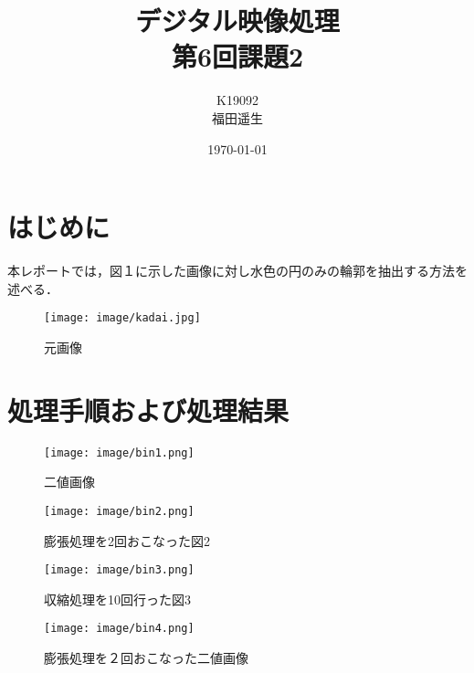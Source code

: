 \documentclass[a4paper,11pt]{jsarticle}
\begin{document}
\title{デジタル映像処理\\第6回課題2}
\author{K19092\\福田遥生}
\date{\today}
\maketitle

\section{はじめに}


本レポートでは，図１に示した画像に対し水色の円のみの輪郭を抽出する方法を述べる．

\begin{figure}[h]
  \centering
  \texttt{[image: image/kadai.jpg]}
  \caption{元画像}
\end{figure}

\section{処理手順および処理結果}
\begin{figure}[h]
  \begin{minipage}{0.5\hsize}
    \begin{center}
      \texttt{[image: image/bin1.png]}
      \caption{二値画像}
    \end{center}
  \end{minipage}
  \begin{minipage}{0.5\hsize}
    \begin{center}
      \texttt{[image: image/bin2.png]}
      \caption{膨張処理を2回おこなった図2}
    \end{center}
  \end{minipage}
\end{figure}
\begin{figure}[h]
  \begin{minipage}{0.5\hsize}
    \begin{center}
      \texttt{[image: image/bin3.png]}
      \caption{収縮処理を10回行った図3}
    \end{center}
  \end{minipage}
  \begin{minipage}{0.5\hsize}
    \begin{center}
      \texttt{[image: image/bin4.png]}
      \caption{膨張処理を２回おこなった二値画像}
    \end{center}
  \end{minipage}
\end{figure}
\end{document}
